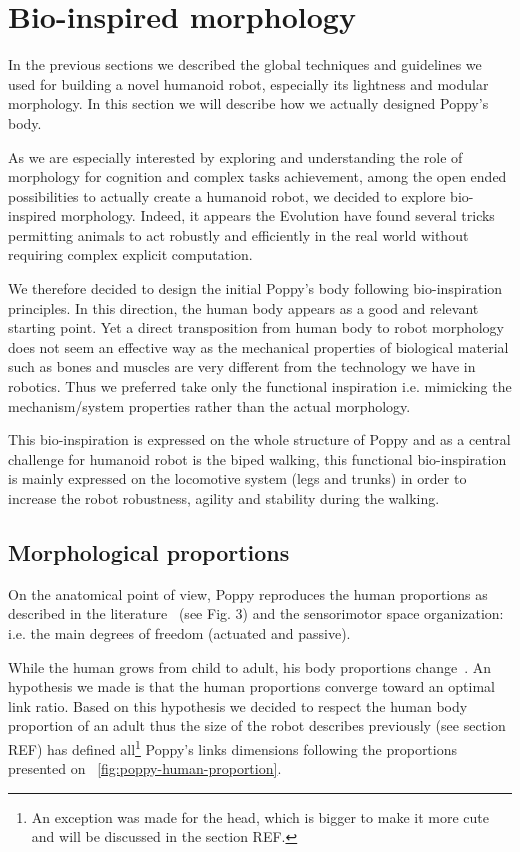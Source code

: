 \section{Bio-inspired morphology} %

In the previous sections we described the global techniques and guidelines we used for building a novel humanoid robot, especially its lightness and modular morphology. In this section we will describe how we actually designed Poppy's body.

As we are especially interested by exploring and understanding the role of morphology for cognition and complex tasks achievement, among the open ended possibilities to actually create a humanoid robot, we decided to explore bio-inspired morphology. Indeed, it appears the Evolution have found several tricks permitting animals to act robustly and efficiently in the real world without requiring complex explicit computation.

We therefore decided to design the initial Poppy's body following bio-inspiration principles. In this direction, the human body appears as a good and relevant starting point. Yet a direct transposition from human body to robot morphology does not seem an effective way as the mechanical properties of biological material such as bones and muscles are very different from the technology we have in robotics. Thus we preferred take only the functional inspiration i.e. mimicking the mechanism/system properties rather than the actual morphology.

This bio-inspiration is expressed on the whole structure of Poppy and as a central challenge for humanoid robot is the biped walking, this functional bio-inspiration is mainly expressed on the locomotive system (legs and trunks) in order to increase the robot robustness, agility and stability during the walking.


\subsection{Morphological proportions} %

On the anatomical point of view, Poppy reproduces the human proportions as described in the literature~\parencite{dufour2005biomecanique} (see Fig. 3) and the sensorimotor space organization: i.e. the main degrees of freedom (actuated and passive).

While the human grows from child to adult, his body proportions change~\parencite{bogin2010leg}. An hypothesis we made is that the human proportions converge toward an optimal link ratio. Based on this hypothesis we decided to respect the human body proportion of an adult thus the size of the robot describes previously (see section REF) has defined all\footnote{An exception was made for the head, which is bigger to make it more cute and will be discussed in the section REF.} Poppy's links dimensions following the proportions presented on \figurename~\ref{fig:poppy-human-proportion}.

